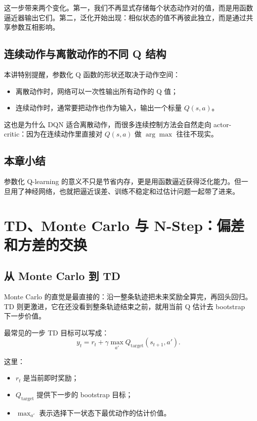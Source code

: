 \documentclass[a4paper]{article}
\begin{document}
这一步带来两个变化。第一，我们不再显式存储每个状态动作对的值，而是用函数逼近器输出它们。第二，泛化开始出现：相似状态的值不再彼此独立，而是通过共享参数互相影响。

\subsection{连续动作与离散动作的不同 Q 结构}

本讲特别提醒，参数化 Q 函数的形状还取决于动作空间：
\begin{itemize}
\item 离散动作时，网络可以一次性输出所有动作的 Q 值；
\item 连续动作时，通常要把动作也作为输入，输出一个标量 \(Q(s,a)\)。
\end{itemize}

这也是为什么 DQN 适合离散动作，而很多连续控制方法会自然走向 actor-critic：因为在连续动作里直接对 \(Q(s,a)\) 做 \(\arg\max\) 往往不现实。

\subsection{本章小结}

参数化 Q-learning 的意义不只是节省内存，更是用函数逼近获得泛化能力。但一旦用了神经网络，也就把逼近误差、训练不稳定和过估计问题一起带了进来。

\section{TD、Monte Carlo 与 N-Step：偏差和方差的交换}

\subsection{从 Monte Carlo 到 TD}

Monte Carlo 的直觉是最直接的：沿一整条轨迹把未来奖励全算完，再回头回归。TD 则更激进，它在还没看到整条轨迹结束之前，就用当前 Q 估计去 bootstrap 下一步价值。

最常见的一步 TD 目标可以写成：
\[
y_t = r_t + \gamma \max_{a'} Q_{\text{target}}(s_{t+1}, a').
\]

这里：
\begin{itemize}
\item \(r_t\) 是当前即时奖励；
\item \(Q_{\text{target}}\) 提供下一步的 bootstrap 目标；
\item \(\max_{a'}\) 表示选择下一状态下最优动作的估计价值。
\end{itemize}
\end{document}
